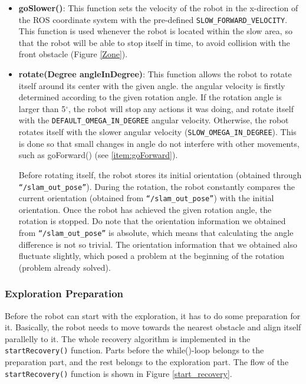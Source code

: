 \begin{itemize}
\item \textbf{goSlower()}: \label{item:goSlower}
This function sets the velocity of the robot in the x-direction of the ROS coordinate system with the pre-defined \texttt{SLOW\_FORWARD\_VELOCITY}. This function is used whenever the robot is located within the slow area, so that the robot will be able to stop itself in time, to avoid collision with the front obstacle (Figure \ref{Zone}).


\item \textbf{rotate(Degree angleInDegree)}: \label{item:rotate}
This function allows the robot to rotate itself around its center with the given angle. the angular velocity is firstly determined according to the given rotation angle. If the rotation angle is larger than 5$^{\circ}$, the robot will stop any actions it was doing, and rotate itself with the \texttt{DEFAULT\_OMEGA\_IN\_DEGREE} angular velocity. Otherwise, the robot rotates itself with the slower angular velocity (\texttt{SLOW\_OMEGA\_IN\_DEGREE}). This is done so that small changes in angle do not interfere with other movements, such as goForward() (see \ref{item:goForward}). 

Before rotating itself, the robot stores its initial orientation (obtained through \texttt{``/slam\_out\_pose''}). During the rotation, the robot constantly compares the current orientation (obtained from \texttt{``/slam\_out\_pose''}) with the initial orientation. Once the robot has achieved the given rotation angle, the rotation is stopped. Do note that the orientation information we obtained from \texttt{``/slam\_out\_pose''} is absolute, which means that calculating the angle difference is not so trivial. The orientation information that we obtained also fluctuate slightly, which posed a problem at the beginning of the rotation (problem already solved).
\end{itemize}

\subsubsection{Exploration Preparation} \label{subsection:implementation_preparation}

Before the robot can start with the exploration, it has to do some preparation for it. Basically, the robot needs to move towards the nearest obstacle and align itself parallelly to it. The whole recovery algorithm is implemented in the \texttt{startRecovery()} function. Parts before the while()-loop belongs to the preparation part, and the rest belongs to the exploration part. The flow of the \texttt{startRecovery()} function is shown in Figure \ref{start_recovery}.

